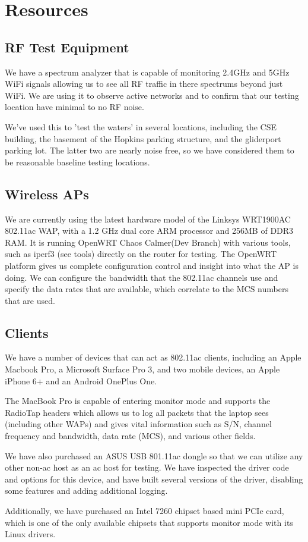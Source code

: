 \section{Resources}

\subsection{RF Test Equipment}

We have a spectrum analyzer that is capable of monitoring 2.4GHz and
5GHz WiFi signals allowing us to see all RF traffic in there spectrums
beyond just WiFi. We are using it to observe active networks and to
confirm that our testing location have minimal to no RF noise.

We've used this to 'test the waters' in several locations, including
the CSE building, the basement of the Hopkins parking structure, and
the gliderport parking lot. The latter two are nearly noise free, so
we have considered them to be reasonable baseline testing locations.

\subsection{Wireless APs}

We are currently using the latest hardware model of the Linksys
WRT1900AC 802.11ac WAP, with a 1.2 GHz dual core ARM processor and
256MB of DDR3 RAM. It is running OpenWRT Chaos Calmer(Dev Branch) with
various tools, such as iperf3 (see tools) directly on the router for
testing. The OpenWRT platform gives us complete configuration control
and insight into what the AP is doing. We can configure the bandwidth that the 
802.11ac channels use and specify the data rates that are available, which correlate
to the MCS numbers that are used.

\subsection{Clients}

We have a number of devices that can act as
802.11ac clients, including an Apple Macbook Pro, a Microsoft Surface Pro 3,
and two mobile devices, an Apple iPhone 6+ and an Android OnePlus
One.

The MacBook Pro is capable of entering monitor mode and supports the RadioTap
headers which allows us to log all packets that the laptop sees (including other WAPs)
and gives vital information such as S/N, channel frequency and bandwidth, data rate (MCS),
and various other fields.

We have also purchased an ASUS USB 801.11ac dongle so that we can
utilize any other non-ac host as an ac host for testing. We have
inspected the driver code and options for this device, and have built
several versions of the driver, disabling some features and adding
additional logging.

Additionally, we have  purchased an Intel 7260 chipset based mini PCIe
card, which is one of the only available chipsets that supports
monitor mode with its Linux drivers.

